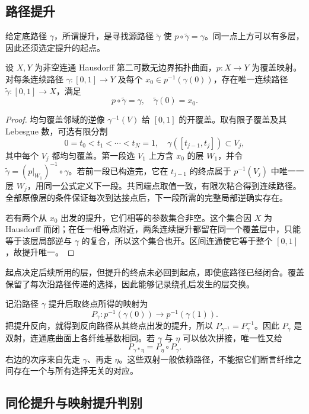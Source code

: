 \subsection{路径提升}
\label{b3:subsec:110102}

给定底路径 \(\gamma\)，所谓提升，是寻找源路径 \(\widetilde\gamma\) 使 \(p\circ\widetilde\gamma=\gamma\)。同一点上方可以有多层，因此还须选定提升的起点。

\begin{theorem}[路径提升]\label{b3:thm:11-path-lifting}
设 \(X,Y\) 为非空连通 Hausdorff 第二可数无边界拓扑曲面，\(p:X\to Y\) 为覆盖映射。对每条连续路径 \(\gamma:[0,1]\to Y\) 及每个 \(x_0\in p^{-1}(\gamma(0))\)，存在唯一连续路径 \(\widetilde\gamma:[0,1]\to X\)，满足
\[
 p\circ\widetilde\gamma=\gamma,
 \quad \widetilde\gamma(0)=x_0.
\]
\end{theorem}
\begin{proof}
均匀覆盖邻域的逆像 \(\gamma^{-1}(V)\) 给 \([0,1]\) 的开覆盖。取有限子覆盖及其 Lebesgue 数，可选有限分割
\[
 0=t_0<t_1<\cdots<t_N=1,
 \quad\gamma([t_{j-1},t_j])\subset V_j,
\]
其中每个 \(V_j\) 都均匀覆盖。第一段选 \(V_1\) 上方含 \(x_0\) 的层 \(W_1\)，并令 \(\widetilde\gamma=(p|_{W_1})^{-1}\circ\gamma\)。若前一段已构造完，它在 \(t_{j-1}\) 的终点属于 \(p^{-1}(V_j)\) 中唯一一层 \(W_j\)，用同一公式定义下一段。共同端点取值一致，有限次粘合得到连续路径。全部原像层的条件保证每次到达接点后，下一段所需的完整局部逆确实存在。

若有两个从 \(x_0\) 出发的提升，它们相等的参数集合非空。这个集合因 \(X\) 为 Hausdorff 而闭；在任一相等点附近，两条连续提升都留在同一个覆盖层中，只能等于该层局部逆与 \(\gamma\) 的复合，所以这个集合也开。区间连通使它等于整个 \([0,1]\)，故提升唯一。
\end{proof}
起点决定后续所用的层，但提升的终点未必回到起点，即使底路径已经闭合。覆盖保留了每次沿路径传递的选择，因此能够记录绕孔后发生的层交换。

\ProseParagraphBreak
记沿路径 \(\gamma\) 提升后取终点所得的映射为
\[
 P_\gamma:p^{-1}(\gamma(0))\longrightarrow p^{-1}(\gamma(1)).
\]
把提升反向，就得到反向路径从其终点出发的提升，所以 \(P_{\gamma^{-1}}=P_\gamma^{-1}\)。因此 \(P_\gamma\) 是双射，连通底曲面上各纤维基数相同。若 \(\gamma\) 与 \(\eta\) 可以依次拼接，唯一性又给
\[
 P_{\gamma*\eta}=P_\eta\circ P_\gamma.
\]
右边的次序来自先走 \(\gamma\)、再走 \(\eta\)。这些双射一般依赖路径，不能据它们断言纤维之间存在一个与所有选择无关的对应。

\subsection{同伦提升与映射提升判别}
\label{b3:subsec:110103}

